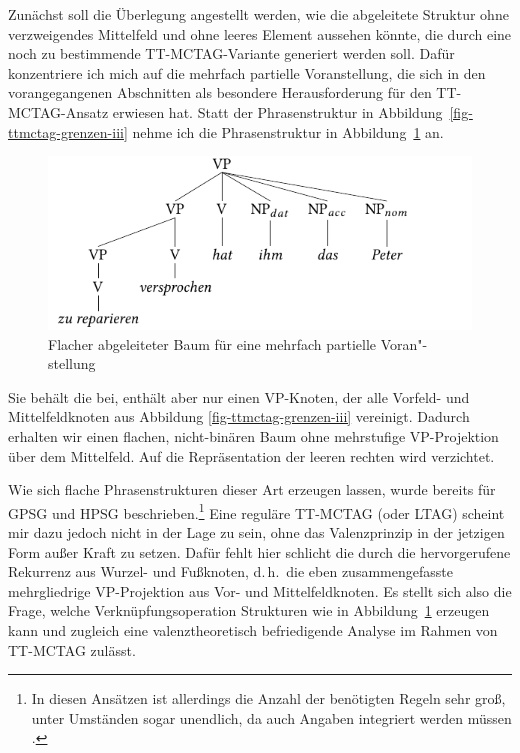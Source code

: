 Zunächst soll die Überlegung angestellt werden, wie die abgeleitete Struktur ohne verzweigendes Mittelfeld und ohne leeres Element aussehen könnte, die durch eine noch zu bestimmende TT-MCTAG-Variante generiert werden soll. Dafür konzentriere ich mich auf die mehrfach partielle Voranstellung, die sich in den vorangegangenen Abschnitten als besondere Herausforderung für den TT-MCTAG-Ansatz erwiesen hat. Statt der Phrasenstruktur in Abbildung~\ref{fig-ttmctag-grenzen-iii} nehme ich die Phrasenstruktur in Abbildung~\ref{fig-ttmctag-spinal-1} an. 
\begin{figure}[t]
\centering
\includegraphics{graphics/abb745.pdf}
\caption{\label{fig-ttmctag-spinal-1}Flacher abgeleiteter Baum für eine mehrfach partielle Voran"-stellung}
\end{figure}
Sie behält die  bei, enthält aber nur einen VP-Knoten, der alle Vorfeld- und Mittelfeldknoten aus Abbildung \ref{fig-ttmctag-grenzen-iii} vereinigt. Dadurch erhalten wir einen flachen, nicht-binären Baum ohne mehrstufige VP-Projektion über dem Mittelfeld. Auf die Repräsentation der leeren rechten  wird verzichtet.     

Wie sich flache Phrasenstrukturen dieser Art erzeugen lassen, wurde bereits für GPSG \citep{Uszkoreit:86,Uszkoreit:87} und HPSG \citep{Pollard:96} beschrieben.\footnote{In diesen Ansätzen ist allerdings die Anzahl der benötigten Regeln sehr gro\ss, unter Umständen sogar unendlich, da auch Angaben integriert werden müssen \citep[Abschnitt~2.2.1]{Mueller:04}.} Eine reguläre TT-MCTAG (oder LTAG) scheint mir dazu jedoch nicht in der Lage zu sein, ohne das Valenzprinzip in der jetzigen Form au\ss er Kraft zu setzen. Dafür fehlt hier schlicht die durch die  hervorgerufene Rekurrenz aus Wurzel- und Fu\ss knoten, d.\,h.\ die eben zusammengefasste mehrgliedrige VP-Projektion aus Vor- und Mittelfeldknoten. Es stellt sich also die Frage, welche Verknüpfungsoperation Strukturen wie in Abbildung~\ref{fig-ttmctag-spinal-1} erzeugen kann und zugleich eine valenztheoretisch befriedigende Analyse im Rahmen von TT-MCTAG zulässt. 

